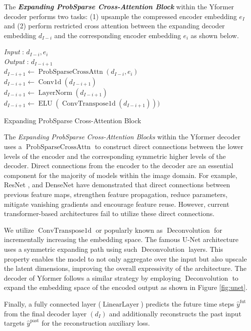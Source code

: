 The \textbf{\textsl{Expanding ProbSparse Cross-Attention Block}} within the Yformer decoder performs two tasks: (1) upsample the compressed encoder embedding $e_I$ and (2) perform restricted cross attention between the expanding decoder embedding $d_{I-i}$ and the corresponding encoder embedding $e_i$ as shown below. 
\begin{algorithm}[H]
    \textit{Input}  : $d_{I-i}, e_i$  \\
    \textit{Output} : $d_{I-i+1}$\\
    $d_{I-i+1} \gets \operatorname{ProbSparseCrossAttn} (d_{I-i}, e_i)$ \\
    $d_{I-i+1} \gets \operatorname{Conv1d} (d_{I-i+1})$\\
    $d_{I-i+1} \gets \operatorname{LayerNorm} (d_{I-i+1})$ \\
    $d_{I-i+1} \gets \operatorname{ELU}(\operatorname{ConvTranspose1d} (d_{I-i+1})))$
 \caption{Expanding ProbSparse Cross-Attention Block}
\end{algorithm}


The \textsl{Expanding ProbSparse Cross-Attention Blocks} within the Yformer decoder uses a $\operatorname{ProbSparseCrossAttn}$ to construct direct connections between the lower levels of the encoder and the corresponding symmetric higher levels of the decoder. Direct connections from the encoder to the decoder are an essential component for the majority of models within the image domain. For example, ResNet \cite{he2016deep}, and DenseNet \cite{huang2017densely} have demonstrated that direct connections between previous feature maps, strengthen feature propagation, reduce parameters, mitigate vanishing gradients and encourage feature reuse. However, current transformer-based architectures fail to utilize these direct connections.  

We utilize $\operatorname{ConvTranspose1d}$ or popularly known as $\operatorname{Deconvolution}$ for incrementally increasing the embedding space. The famous U-Net architecture uses a symmetric expanding path using such $\operatorname{Deconvolution}$ layers. This property enables the model to not only aggregate over the input but also upscale the latent dimensions, improving the overall expressivity of the architecture. The decoder of Yformer follows a similar strategy by employing $\operatorname{Deconvolution}$ to expand the embedding space of the encoded output as shown in Figure \ref{fig:unet}.

Finally, a fully connected layer ($\operatorname{LinearLayer}$) predicts the future time steps $\hat{y}^{\text{fut}}$ from the  final decoder layer $(d_I)$ and additionally reconstructs the past input targets $\hat{y}^{\text{past}}$ for the reconstruction auxiliary loss.

